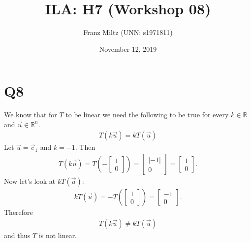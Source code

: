 \documentclass{article}
\title{ILA: H7 (Workshop 08)}
\author{Franz Miltz (UNN: s1971811)}
\date{November 12, 2019}
\begin{document}
\maketitle
\section*{Q8}
We know that for $T$ to be linear we need the following to be true for every $k\in\mathbb{R}$ and $\vec u \in\mathbb{R}^n$. 
\begin{align*}
    T(k\vec u) = k T(\vec u)
\end{align*}
Let $\vec u = \vec e_1$ and $k = -1$. Then
\begin{align*}
    T(k\vec u) = T\left(-\begin{bmatrix}
        1\\ 0
    \end{bmatrix}\right) = 
    \begin{bmatrix}
        |-1|\\ 0
    \end{bmatrix} =
    \begin{bmatrix}
        1\\0
    \end{bmatrix}.
\end{align*}
Now let's look at $kT(\vec u)$:
\begin{align*}
    kT(\vec u) = -T\left(\begin{bmatrix}
        1\\ 0
    \end{bmatrix}\right)
    = \begin{bmatrix}
        -1\\ 0
    \end{bmatrix}.
\end{align*}
Therefore
\begin{align*}
    T(k\vec u) \not= kT(\vec u)
\end{align*}
and thus $T$ is not linear.
\end{document}
